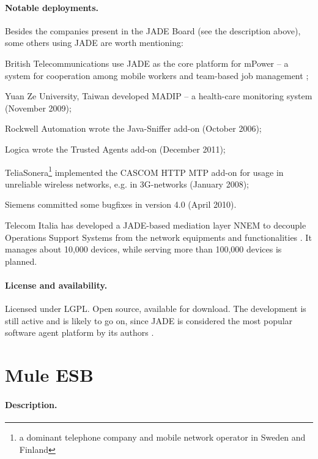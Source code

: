 \documentclass[a4paper]{report}
\begin{document}
\paragraph{Notable deployments.} Besides the companies present in the JADE Board (see the description above), some others using JADE are worth mentioning:
\begin{compactitem}
\item British Telecommunications use JADE as the core platform for mPower -- a system for cooperation among mobile workers and team-based job management \cite{bellifemine2008jade};
\item Yuan Ze University, Taiwan developed MADIP -- a health-care monitoring system \cite{su2011jade} (November 2009);
\item Rockwell Automation wrote the Java-Sniffer add-on (October 2006);
\item Logica wrote the Trusted Agents add-on (December 2011);
\item TeliaSonera\footnote{a dominant telephone company and mobile network operator in Sweden and Finland} implemented the CASCOM HTTP MTP add-on for usage in unreliable wireless networks, e.g. in 3G-networks (January 2008);
\item Siemens committed some bugfixes in version 4.0 (April 2010).
\end{compactitem}
Telecom Italia has developed a JADE-based mediation layer NNEM to decouple Operations Support Systems from the network equipments and functionalities \cite{bellifemine2008jade}. It manages about 10,000 devices, while serving more than 100,000 devices is planned.


\paragraph{License and availability.} Licensed under LGPL. Open source, available for download. The development is still active and is likely to go on, since JADE is considered the most popular software agent platform by its authors \cite{bellifemine2008jade}.



\section{Mule ESB}

\paragraph{Description.}
\end{document}
